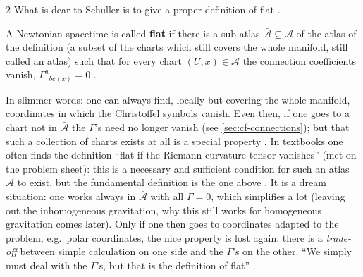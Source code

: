 \begin{paracol}{2}
What is dear to Schuller is to give a proper definition of flat .
\begin{definition}\label{def:nk-flat}
A Newtonian spacetime is called \textbf{flat} if there is a sub-atlas $\bar{\mathcal A}\subseteq\mathcal A$ of the atlas of the definition (a subset of the charts which still covers the whole
manifold, still called an atlas) such that for every chart $(U,x)\in\bar{\mathcal A}$ the connection coefficients vanish,
$\Gamma^a{}_{bc}{}_{(x)}=0$ .
\end{definition}
In slimmer words: one can always find, locally but covering the whole manifold, coordinates in which the Christoffel symbols vanish. Even then, if one goes to a chart not in
$\bar{\mathcal A}$ the $\Gamma$'s need no longer vanish (see \cref{sec:cf-connections}); but that such a collection of charts exists at all is a special property . In textbooks one often finds
the definition ``flat if the Riemann curvature tensor vanishes'' (met on the problem sheet): this is a necessary and sufficient condition for such an atlas $\bar{\mathcal A}$ to exist, but the
fundamental definition is the one above . It is a dream situation: one works always in $\bar{\mathcal A}$ with all $\Gamma=0$, which
simplifies a lot (leaving out the inhomogeneous gravitation, why this still works for homogeneous gravitation comes later). Only if one then goes to coordinates adapted to
the problem, e.g.\ polar coordinates, the nice property is lost again: there is a \emph{trade-off} between simple calculation on one side and the $\Gamma$'s on
the other. ``We simply must deal with the $\Gamma$'s, but that is the definition of flat'' .


\end{paracol}

